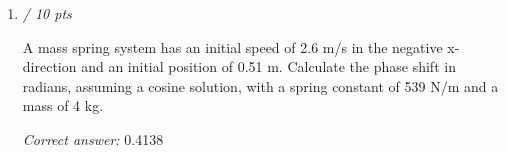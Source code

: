 \documentclass[11pt]{article}
\begin{document}
\begin{enumerate}[leftmargin=*,label=\textbf{Question \arabic*.}]
\begin{itemize}
  \item \textbf{[correct]} 44.8
\end{itemize}
\textit{Answer 8:}
\begin{itemize}
  \item 0.6996
  \item -0.523
  \item \textbf{[correct]} -0.226
  \item -0.334
\end{itemize}
\textit{Answer 9:}
\begin{itemize}
  \item -4.15
  \item \textbf{[correct]} -5.30
  \item -2.62
  \item 2.62
  \item 5.30
\end{itemize}
\textit{Answer 10:}
\begin{itemize}
  \item -13.2
  \item 19.3
  \item 8.92
  \item \textbf{[correct]} 14.48
  \item -5.80
\end{itemize}
\textit{Answer 11:}
\begin{itemize}
  \item \textbf{[correct]} 0.352
  \item 0.265
  \item 0.155
  \item 0.785
  \item 0.418
\end{itemize}
\textit{Answer 12:}
\begin{itemize}
  \item 0.405
  \item \textbf{[correct]} 0.155
  \item 0.261
  \item 0.352
\end{itemize}

\item \hfill \textit{/ 10 pts}

A mass spring system has an initial speed of 2.6 m/s in the negative x-direction and an initial position of 0.51 m. Calculate the phase shift in radians, assuming a cosine solution, with a spring constant of 539 N/m and a mass of 4 kg.

\textit{Correct answer: } 0.4138


\end{enumerate}
\end{document}
